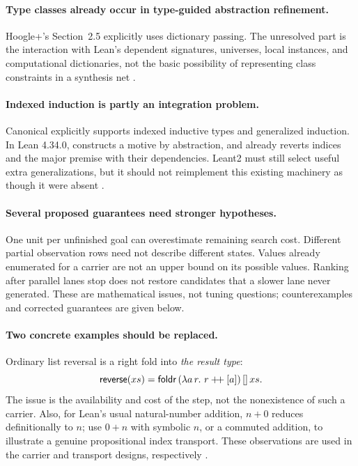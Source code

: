 \paragraph{Type classes already occur in type-guided abstraction refinement.}
Hoogle+'s Section~2.5 explicitly uses dictionary passing. The unresolved part
is the interaction with Lean's dependent signatures, universes, local
instances, and computational dictionaries, not the basic possibility of
representing class constraints in a synthesis net \cite{hoogleplus}.

\paragraph{Indexed induction is partly an integration problem.}
Canonical explicitly supports indexed inductive types and generalized
induction. In Lean 4.34.0,  constructs a
motive by abstraction, and  already reverts indices and
the major premise with their dependencies. Leant2 must still select useful
extra generalizations, but it should not reimplement this existing machinery
as though it were absent \cite{canonical,leaninduction}.

\paragraph{Several proposed guarantees need stronger hypotheses.}
One unit per unfinished goal can overestimate remaining search cost.
Different partial observation rows need not describe different states.
Values already enumerated for a carrier are not an upper bound on its possible
values. Ranking after parallel lanes stop does not restore candidates that a
slower lane never generated. These are mathematical issues, not tuning
questions; counterexamples and corrected guarantees are given below.

\paragraph{Two concrete examples should be replaced.}
Ordinary list reversal is a right fold into \emph{the result type}:
\[
 \mathsf{reverse}(xs)=\mathsf{foldr}\,(\lambda a\,r.\ r\mathbin{+\!+}[a])\,[]\,xs.
\]
The issue is the availability and cost of the step, not the nonexistence of
such a carrier. Also, for Lean's usual natural-number addition, $n+0$ reduces
definitionally to $n$; use $0+n$ with symbolic $n$, or a commuted addition,
to illustrate a genuine propositional index transport. These observations
are used in the carrier and transport designs, respectively \cite{leanprelude}.

